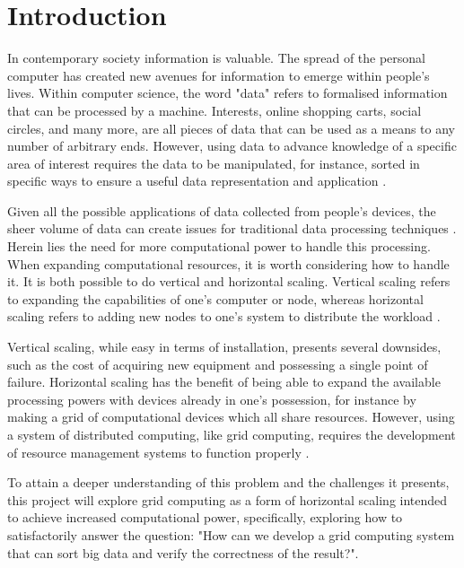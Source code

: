 \chapter{Introduction}\label{ch:introduction}

In contemporary society information is valuable. The spread of the personal computer has created new avenues for information to emerge within people's lives. Within computer science, the word "data" refers to formalised information that can be processed by a machine. Interests, online shopping carts, social circles, and many more, are all pieces of data that can be used as a means to any number of arbitrary ends. However, using data to advance knowledge of a specific area of interest requires the data to be manipulated, for instance, sorted in specific ways to ensure a useful data representation and application \cite{data_ref}.

Given all the possible applications of data collected from people's devices, the sheer volume of data can create issues for traditional data processing techniques \cite{big_data_oracle}. Herein lies the need for more computational power to handle this processing. When expanding computational resources, it is worth considering how to handle it. It is both possible to do vertical and horizontal scaling. Vertical scaling refers to expanding the capabilities of one's computer or node, whereas horizontal scaling refers to adding new nodes to one's system to distribute the workload \cite{scaling_geeks}.


Vertical scaling, while easy in terms of installation, presents several downsides, such as the cost of acquiring new equipment and possessing a single point of failure. Horizontal scaling has the benefit of being able to expand the available processing powers with devices already in one's possession, for instance by making a grid of computational devices which all share resources. However, using a system of distributed computing, like grid computing, requires the development of resource management systems to function properly \cite{TaskSchedulingReview}.

To attain a deeper understanding of this problem and the challenges it presents, this project will explore grid computing as a form of horizontal scaling intended to achieve increased computational power, specifically, exploring how to satisfactorily answer the question: "How can we develop a grid computing system that can sort big data and verify the correctness of the result?".



